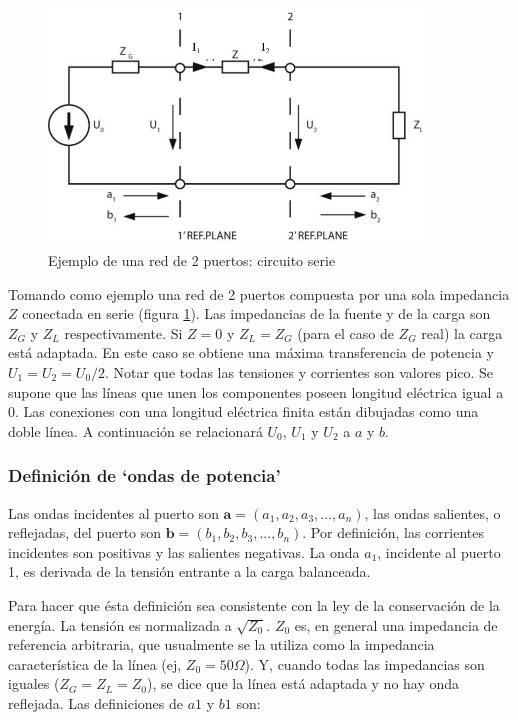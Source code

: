 \begin{figure}[H]
 \centering
 \includegraphics[width=10cm]{gfx/sParameters1.png}
 \caption{Ejemplo de una red de 2 puertos: circuito serie}
 \label{fig:esquema_serie}
\end{figure}

Tomando como ejemplo una red de 2 puertos compuesta por una sola impedancia $Z$ conectada en serie (figura \ref{fig:esquema_serie}).
Las impedancias de la fuente y de la carga son $Z_G$ y $Z_L$ respectivamente. Si $Z=0$ y $Z_L = Z_G$ (para el caso de $Z_G$ real)
la carga está adaptada. En este caso se obtiene una máxima transferencia de potencia y $U_1 = U_2 = U_0/2$. Notar que todas las
tensiones y corrientes son valores pico. Se supone que las líneas que unen los componentes poseen longitud eléctrica igual a 0.
Las conexiones con una longitud eléctrica finita están dibujadas como una doble línea. A continuación se relacionará $U_0$, $U_1$
y $U_2$ a $a$ y $b$.


\subsubsection{Definición de \enquote*{ondas de potencia}}

Las ondas incidentes al puerto son $\textbf{a}=(a_1, a_2, a_3, ..., a_n)$, las ondas salientes, o reflejadas, del puerto son
$\textbf{b}=(b_1, b_2, b_3, ..., b_n)$. Por definición, las corrientes incidentes son positivas y las salientes negativas. La
onda $a_1$, incidente al puerto 1, es derivada de la tensión entrante a la carga balanceada.

Para hacer que ésta definición sea consistente con la ley de la conservación de la energía. La tensión es normalizada a $\sqrt{Z_0}$.
$Z_0$ es, en general una impedancia de referencia arbitraria, que usualmente se la utiliza como la impedancia característica de la
línea (ej, $Z_0 = 50 \Omega$). Y, cuando todas las impedancias son iguales ($Z_G = Z_L = Z_0$), se dice que la línea está adaptada
y no hay onda reflejada. Las definiciones de $a1$ y $b1$ son:

